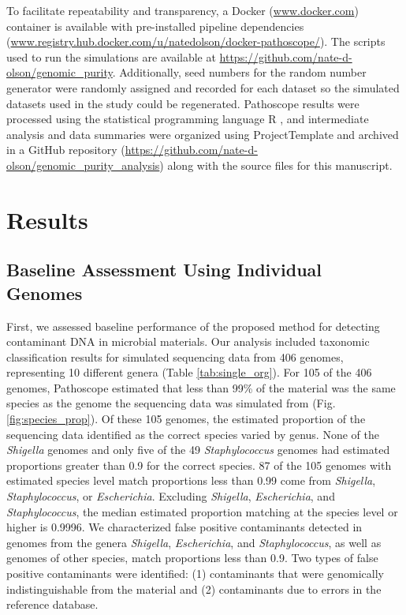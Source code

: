 \documentclass[fleqn,10pt,lineno]{wlpeerj}\usepackage[]{graphicx}\usepackage[]{color}
\begin{document}

To facilitate repeatability and transparency, a Docker (\url{www.docker.com}) container is available 
with pre-installed pipeline dependencies (\url{www.registry.hub.docker.com/u/natedolson/docker-pathoscope/}). 
The scripts used to run the simulations are available at \url{https://github.com/nate-d-olson/genomic_purity}.
Additionally, seed numbers for the random number generator were randomly assigned and recorded for each dataset so the simulated datasets used in the study could be regenerated.
Pathoscope results were processed using the statistical programming language R \citep{R}, and intermediate analysis and data summaries were organized using ProjectTemplate \citep{ProjectTemplate} and archived in a GitHub repository (\url{https://github.com/nate-d-olson/genomic_purity_analysis}) along with the source files for this manuscript.

\section*{Results}

\subsection*{Baseline Assessment Using Individual Genomes}

First, we assessed baseline performance of the proposed method for detecting contaminant DNA in microbial materials. 
Our analysis included taxonomic classification results for simulated sequencing data  from 406 genomes, representing 10 different genera (Table \ref{tab:single_org}). 
For 105 of the 406 genomes, Pathoscope estimated that less than 99\% of the material was the same species as the genome the sequencing data was simulated from (Fig. \ref{fig:species_prop}). 
Of these 105 genomes, the estimated proportion of the sequencing data identified as the correct species varied by genus. 
None of the \textit{Shigella} genomes and only five of the 49 \textit{Staphylococcus} genomes had estimated proportions greater than 0.9 for the correct species. 
87 of the 105 genomes with estimated species level match proportions less than 0.99 come from \textit{Shigella}, \textit{Staphylococcus}, or \textit{Escherichia}. 
Excluding \textit{Shigella}, \textit{Escherichia}, and \textit{Staphylococcus}, the median estimated proportion matching at the species level or higher is  0.9996. 
We characterized false positive contaminants detected in genomes from the genera \textit{Shigella}, \textit{Escherichia}, and \textit{Staphylococcus}, as well as genomes of other species, match proportions less than 0.9. 
Two types of false positive contaminants were identified: (1) contaminants that were genomically indistinguishable from the material and (2) contaminants due to errors in the reference database.
\end{document}
